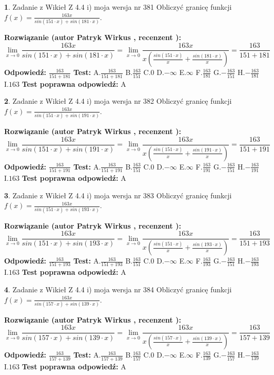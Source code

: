 \documentclass[12pt, a4paper]{article}
\theoremstyle{definition} %
\newtheorem{zad}{}
\newcommand{\zadStart}[1]{\begin{zad}#1\newline}
\newcommand{\zadStop}{\end{zad}}
\newcommand{\rozwStart}[2]{\noindent \textbf{Rozwiązanie (autor #1 , recenzent #2): }\newline}
\newcommand{\rozwStop}{\newline}
\newcommand{\odpStart}{\noindent \textbf{Odpowiedź:}\newline}
\newcommand{\odpStop}{\newline}
\newcommand{\testStart}{\noindent \textbf{Test:}\newline}
\newcommand{\testStop}{\newline}
\newcommand{\kluczStart}{\noindent \textbf{Test poprawna odpowiedź:}\newline}
\newcommand{\kluczStop}{\newline}
\begin{document}
\zadStart{Zadanie z Wikieł Z 4.4 i) moja wersja nr 381}
Obliczyć granicę funkcji $f(x)=\frac{163x}{sin(151\cdot x) +sin(181\cdot x)}$.
\zadStop
\rozwStart{Patryk Wirkus}{}
$$\lim\limits_{x\to 0}\frac{163x}{sin(151\cdot x) +sin(181\cdot x)}=\lim\limits_{x\to 0}\frac{163x}{x(\frac{sin(151\cdot x)}{x}+\frac{sin(181\cdot x)}{x})}=\frac{163}{151+181}$$
\rozwStop
\odpStart
$\frac{163}{151+181}$
\odpStop
\testStart
A.$\frac{163}{151+181}$
B.$\frac{163}{151}$
C.$0$
D.$-\infty$
E.$\infty$
F.$\frac{163}{181}$
G.$-\frac{163}{151}$
H.$-\frac{163}{181}$
I.$163$
\testStop
\kluczStart
A
\kluczStop



\zadStart{Zadanie z Wikieł Z 4.4 i) moja wersja nr 382}
Obliczyć granicę funkcji $f(x)=\frac{163x}{sin(151\cdot x) +sin(191\cdot x)}$.
\zadStop
\rozwStart{Patryk Wirkus}{}
$$\lim\limits_{x\to 0}\frac{163x}{sin(151\cdot x) +sin(191\cdot x)}=\lim\limits_{x\to 0}\frac{163x}{x(\frac{sin(151\cdot x)}{x}+\frac{sin(191\cdot x)}{x})}=\frac{163}{151+191}$$
\rozwStop
\odpStart
$\frac{163}{151+191}$
\odpStop
\testStart
A.$\frac{163}{151+191}$
B.$\frac{163}{151}$
C.$0$
D.$-\infty$
E.$\infty$
F.$\frac{163}{191}$
G.$-\frac{163}{151}$
H.$-\frac{163}{191}$
I.$163$
\testStop
\kluczStart
A
\kluczStop



\zadStart{Zadanie z Wikieł Z 4.4 i) moja wersja nr 383}
Obliczyć granicę funkcji $f(x)=\frac{163x}{sin(151\cdot x) +sin(193\cdot x)}$.
\zadStop
\rozwStart{Patryk Wirkus}{}
$$\lim\limits_{x\to 0}\frac{163x}{sin(151\cdot x) +sin(193\cdot x)}=\lim\limits_{x\to 0}\frac{163x}{x(\frac{sin(151\cdot x)}{x}+\frac{sin(193\cdot x)}{x})}=\frac{163}{151+193}$$
\rozwStop
\odpStart
$\frac{163}{151+193}$
\odpStop
\testStart
A.$\frac{163}{151+193}$
B.$\frac{163}{151}$
C.$0$
D.$-\infty$
E.$\infty$
F.$\frac{163}{193}$
G.$-\frac{163}{151}$
H.$-\frac{163}{193}$
I.$163$
\testStop
\kluczStart
A
\kluczStop



\zadStart{Zadanie z Wikieł Z 4.4 i) moja wersja nr 384}
Obliczyć granicę funkcji $f(x)=\frac{163x}{sin(157\cdot x) +sin(139\cdot x)}$.
\zadStop
\rozwStart{Patryk Wirkus}{}
$$\lim\limits_{x\to 0}\frac{163x}{sin(157\cdot x) +sin(139\cdot x)}=\lim\limits_{x\to 0}\frac{163x}{x(\frac{sin(157\cdot x)}{x}+\frac{sin(139\cdot x)}{x})}=\frac{163}{157+139}$$
\rozwStop
\odpStart
$\frac{163}{157+139}$
\odpStop
\testStart
A.$\frac{163}{157+139}$
B.$\frac{163}{157}$
C.$0$
D.$-\infty$
E.$\infty$
F.$\frac{163}{139}$
G.$-\frac{163}{157}$
H.$-\frac{163}{139}$
I.$163$
\testStop
\kluczStart
A
\kluczStop
\end{document}
